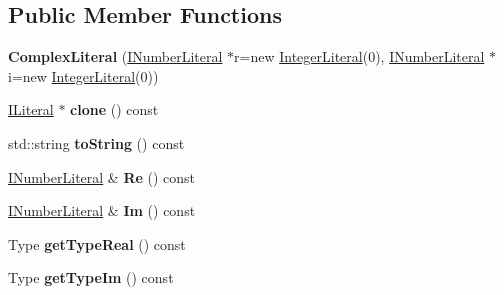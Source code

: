 \subsection*{Public Member Functions}
\begin{DoxyCompactItemize}
\item 
{\bfseries Complex\+Literal} (\hyperlink{class_i_number_literal}{I\+Number\+Literal} $\ast$r=new \hyperlink{class_integer_literal}{Integer\+Literal}(0), \hyperlink{class_i_number_literal}{I\+Number\+Literal} $\ast$i=new \hyperlink{class_integer_literal}{Integer\+Literal}(0))\hypertarget{class_complex_literal_a49f6f9936ffbbcad5b1aa5b99f0202f9}{}\label{class_complex_literal_a49f6f9936ffbbcad5b1aa5b99f0202f9}

\item 
\hyperlink{class_i_literal}{I\+Literal} $\ast$ {\bfseries clone} () const \hypertarget{class_complex_literal_ad76d4572dafd9dcd4e82dcd20b0d1b57}{}\label{class_complex_literal_ad76d4572dafd9dcd4e82dcd20b0d1b57}

\item 
std\+::string {\bfseries to\+String} () const \hypertarget{class_complex_literal_aa1a06301b9dece737217a1684187b711}{}\label{class_complex_literal_aa1a06301b9dece737217a1684187b711}

\item 
\hyperlink{class_i_number_literal}{I\+Number\+Literal} \& {\bfseries Re} () const \hypertarget{class_complex_literal_a3ddf29d8fb18f80b6081cace78013bb3}{}\label{class_complex_literal_a3ddf29d8fb18f80b6081cace78013bb3}

\item 
\hyperlink{class_i_number_literal}{I\+Number\+Literal} \& {\bfseries Im} () const \hypertarget{class_complex_literal_a4fafc3f6a30fcb332ed7fbdcf3241881}{}\label{class_complex_literal_a4fafc3f6a30fcb332ed7fbdcf3241881}

\item 
Type {\bfseries get\+Type\+Real} () const \hypertarget{class_complex_literal_abf18f83dd1ee3173aa9fbcb40a71aed1}{}\label{class_complex_literal_abf18f83dd1ee3173aa9fbcb40a71aed1}

\item 
Type {\bfseries get\+Type\+Im} () const \hypertarget{class_complex_literal_a8e1880f4100f287d9e454ea5114ff040}{}\label{class_complex_literal_a8e1880f4100f287d9e454ea5114ff040}

\end{DoxyCompactItemize}
